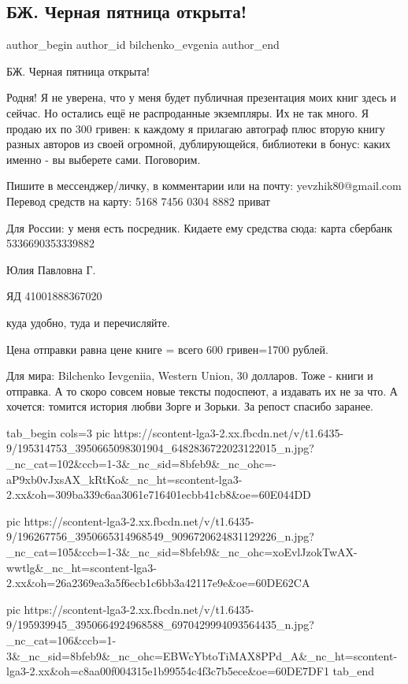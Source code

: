  
 
 
 
 
 
\subsection{БЖ. Черная пятница открыта!}
\label{sec:03_06_2021.fb.bilchenko_evgenia.2.knigi}
\ifcmt
 author_begin
   author_id bilchenko_evgenia
 author_end
\fi

БЖ. Черная пятница открыта!

Родня! Я не уверена, что у меня будет публичная презентация моих книг здесь и
сейчас. Но остались ещё не распроданные экземпляры. Их не так много. Я продаю
их по 300 гривен: к каждому я прилагаю автограф плюс вторую книгу разных
авторов из своей огромной, дублирующейся, библиотеки в бонус: каких именно - вы
выберете сами. Поговорим.

Пишите в мессенджер/личку, в комментарии или на почту: yevzhik80@gmail.com
Перевод средств на карту:
5168 7456 0304 8882 приват

Для России: у меня есть посредник. Кидаете ему средства сюда: карта сбербанк 5336690353339882

Юлия Павловна Г.

ЯД 41001888367020

куда удобно, туда и перечисляйте.

Цена отправки равна цене книге = всего 600 гривен=1700 рублей.

Для мира: Bilchenko Ievgeniia, Western Union, 30 долларов. Тоже - книги и
отправка. А то скоро совсем новые тексты подоспеют, а издавать их не за что. А
хочется: томится история любви Зорге и Зорьки. За репост спасибо заранее.

\ifcmt
  tab_begin cols=3
     pic https://scontent-lga3-2.xx.fbcdn.net/v/t1.6435-9/195314753_3950665098301904_6482836722023122015_n.jpg?_nc_cat=102&ccb=1-3&_nc_sid=8bfeb9&_nc_ohc=-aP9xb0vJxsAX_kRtKo&_nc_ht=scontent-lga3-2.xx&oh=309ba339c6aa3061e716401ecbb41cb8&oe=60E044DD

     pic https://scontent-lga3-2.xx.fbcdn.net/v/t1.6435-9/196267756_3950665314968549_9096720624831129226_n.jpg?_nc_cat=105&ccb=1-3&_nc_sid=8bfeb9&_nc_ohc=xoEvlJzokTwAX-wwtlg&_nc_ht=scontent-lga3-2.xx&oh=26a2369ea3a5f6ecb1c6bb3a42117e9e&oe=60DE62CA

     pic https://scontent-lga3-2.xx.fbcdn.net/v/t1.6435-9/195939945_3950664924968588_6970429994093564435_n.jpg?_nc_cat=106&ccb=1-3&_nc_sid=8bfeb9&_nc_ohc=EBWcYbtoTiMAX8PPd_A&_nc_ht=scontent-lga3-2.xx&oh=c8aa00f004315e1b99554c4f3c7b5ece&oe=60DE7DF1
  tab_end
\fi

